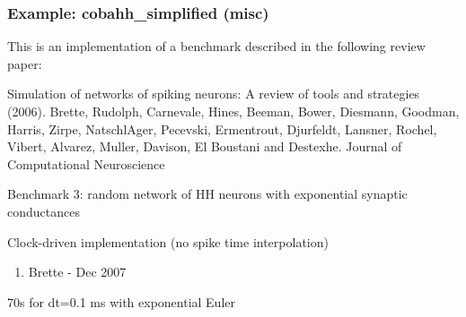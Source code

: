 \documentclass[letterpaper,10pt,english]{manual}
\begin{document}
\resetcurrentobjects
\hypertarget{--doc-examples-misc_cobahh_simplified}{}

\hypertarget{index-60}{}\subsubsection{Example: cobahh\_simplified (misc)}

This is an implementation of a benchmark described
in the following review paper:

Simulation of networks of spiking neurons: A review of tools and strategies (2006).
Brette, Rudolph, Carnevale, Hines, Beeman, Bower, Diesmann, Goodman, Harris, Zirpe,
NatschlAger, Pecevski, Ermentrout, Djurfeldt, Lansner, Rochel, Vibert, Alvarez, Muller,
Davison, El Boustani and Destexhe.
Journal of Computational Neuroscience

Benchmark 3: random network of HH neurons with exponential synaptic conductances

Clock-driven implementation
(no spike time interpolation)
\begin{enumerate}
\item {} 
Brette - Dec 2007

\end{enumerate}

70s for dt=0.1 ms with exponential Euler
\end{document}
